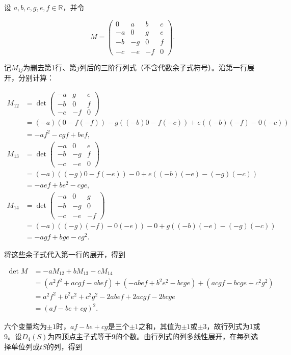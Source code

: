 \documentclass[11pt,a4paper]{article}
\begin{document}
设 \(a,b,c,g,e,f\in\mathbb R\)，并令

\[
M=\begin{pmatrix}
0&a&b&c\\
-a&0&g&e\\
-b&-g&0&f\\
-c&-e&-f&0
\end{pmatrix}.
\]

记\(M_{1j}\)为删去第1行、第\(j\)列后的三阶行列式（不含代数余子式符号）。沿第一行展开，分别计算：

\[
\begin{aligned}
M_{12}
&=\det\begin{pmatrix}-a&g&e\\-b&0&f\\-c&-f&0\end{pmatrix}\\
&=(-a)(0-f(-f))-g((-b)0-f(-c))+e((-b)(-f)-0(-c))\\
&=-af^2-cgf+bef,\\
M_{13}
&=\det\begin{pmatrix}-a&0&e\\-b&-g&f\\-c&-e&0\end{pmatrix}\\
&=(-a)((-g)0-f(-e))-0+e((-b)(-e)-(-g)(-c))\\
&=-aef+be^2-cge,\\
M_{14}
&=\det\begin{pmatrix}-a&0&g\\-b&-g&0\\-c&-e&-f\end{pmatrix}\\
&=(-a)((-g)(-f)-0(-e))-0+g((-b)(-e)-(-g)(-c))\\
&=-agf+bge-cg^2.
\end{aligned}
\]

将这些余子式代入第一行的展开，得到

\[
\begin{aligned}
\det M
&=-aM_{12}+bM_{13}-cM_{14}\\
&=(a^2f^2+acgf-abef)
+(-abef+b^2e^2-bcge)
+(acgf-bcge+c^2g^2)\\
&=a^2f^2+b^2e^2+c^2g^2-2abef+2acgf-2bcge\\
&=(af-be+cg)^2.
\end{aligned}
\]

六个变量均为\(\pm1\)时，\(af-be+cg\)是三个\(\pm1\)之和，其值为\(\pm1\)或\(\pm3\)，故行列式为1或9。设\(D_4(S)\)为四顶点主子式等于9的个数。由行列式的列多线性展开，在每列选择单位列或\(tS\)的列，得到
\end{document}

